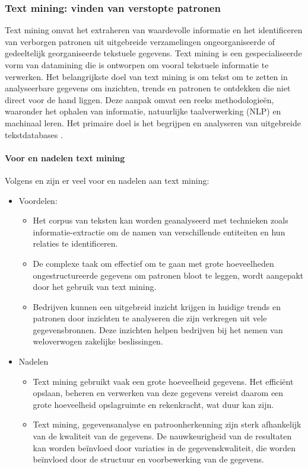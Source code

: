 \subsubsection{Text mining: vinden van verstopte patronen}
Text mining omvat het extraheren van waardevolle informatie en het identificeren van verborgen patronen uit uitgebreide verzamelingen ongeorganiseerde of gedeeltelijk georganiseerde tekstuele gegevens. Text mining is een gespecialiseerde vorm van datamining die is ontworpen om vooral tekstuele informatie te verwerken. Het belangrijkste doel van text mining is om tekst om te zetten in analyseerbare gegevens om inzichten, trends en patronen te ontdekken die niet direct voor de hand liggen. Deze aanpak omvat een reeks methodologieën, waaronder het ophalen van informatie, natuurlijke taalverwerking (NLP) en machinaal leren. Het primaire doel is het begrijpen en analyseren van uitgebreide tekstdatabases \autocite{gaikwad2014text}.

\paragraph{Voor en nadelen text mining}
Volgens \autocite{Kinter2024} en \autocite{gaikwad2014text} zijn er veel voor en nadelen aan text mining:
\begin{itemize}
    \item Voordelen:
  \begin{itemize}
    \item Het corpus van teksten kan worden geanalyseerd met technieken zoals informatie-extractie om de namen van verschillende entiteiten en hun relaties te identificeren. 
    \item De complexe taak om effectief om te gaan met grote hoeveelheden ongestructureerde gegevens om patronen bloot te leggen, wordt aangepakt door het gebruik van text mining.
    \item Bedrijven kunnen een uitgebreid inzicht krijgen in huidige trends en patronen door inzichten te analyseren die zijn verkregen uit vele gegevensbronnen. Deze inzichten helpen bedrijven bij het nemen van weloverwogen zakelijke beslissingen.

  \end{itemize}
  \item Nadelen
  \begin{itemize}
    \item Text mining gebruikt vaak een grote hoeveelheid gegevens. Het efficiënt opslaan, beheren en verwerken van deze gegevens vereist daarom een grote hoeveelheid opslagruimte en rekenkracht, wat duur kan zijn.
    \item Text mining, gegevensanalyse en patroonherkenning zijn sterk afhankelijk van de kwaliteit van de gegevens. De nauwkeurigheid van de resultaten kan worden beïnvloed door variaties in de gegevenskwaliteit, die worden beïnvloed door de structuur en voorbewerking van de gegevens.
  \end{itemize}
\end{itemize}


